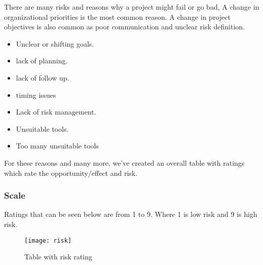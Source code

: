 There are many risks and reasons why a project might fail or go bad, A change in organizational priorities is the most common reason. A change in project objectives is also common as poor communication and unclear risk definition.
	\begin{itemize}
		\setlength\itemsep{-0.2em}
		\item Unclear or shifting goals.
		\item lack of planning.
		\item lack of follow up.
		\item timing issues 
		\item Lack of risk management.
		\item Unsuitable tools.
		\item Too many unsuitable tools
	\end{itemize}

For these reasons and many more, we’ve created an overall table with ratings which rate the opportunity/effect and risk.

\subsubsection{Scale} %
Ratings that can be seen below are from 1 to 9. Where 1 is low risk and 9 is high risk.\\
	
	\begin{figure}[!ht]
		\texttt{[image: risk]}
		\caption{Table with risk rating}
		\label{fig:risk}
	\end{figure}